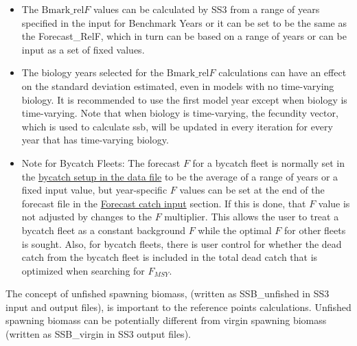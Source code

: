 \begin{itemize}
	\item The $\text{Bmark\_rel}F$ values can be calculated by SS3 from a range of years specified in the input for Benchmark Years or it can be set to be the same as the Forecast\_RelF, which in turn can be based on a range of years or can be input as a set of fixed values.
	
	\item The biology years selected for the $\text{Bmark\_rel}F$ calculations can have an effect on the standard deviation estimated, even in models with no time-varying biology. It is recommended to use the first model year except when biology is time-varying. Note that when biology is time-varying, the fecundity vector, which is used to calculate \gls{ssb}, will be updated in every iteration for every year that has time-varying biology.
	
	\item Note for Bycatch Fleets: The forecast $F$ for a bycatch fleet is normally set in the \hyperlink{BycatchFleets}{bycatch setup in the data file} to be the average of a range of years or a fixed input value, but year-specific $F$ values can be set at the end of the forecast file in the \hyperlink{ForecastCatchInput}{Forecast catch input} section. If this is done, that $F$ value is not adjusted by changes to the $F$ multiplier. This allows the user to treat a bycatch fleet as a constant background $F$ while the optimal $F$ for other fleets is sought. Also, for bycatch fleets, there is user control for whether the dead catch from the bycatch fleet is included in the total dead catch that is optimized when searching for $F_{MSY}$.
  
\end{itemize}

The concept of unfished spawning biomass, (written as SSB\_unfished in SS3 input and output files), is important to the reference points calculations. Unfished spawning biomass can be potentially different from virgin spawning biomass (written as SSB\_virgin in SS3 output files).

